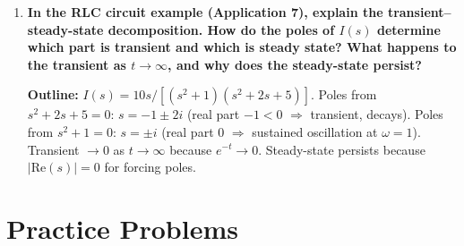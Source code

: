 \documentclass[12pt,a4paper]{article}
\begin{document}
\begin{enumerate}
\textbf{Outline:} $(s+0)X + 2Y = 1$; $-2X + sY = 0$.
Determinant: $s^2+4$.
$X = s/(s^2+4) \to \cos(2t)$.
$Y = 2/(s^2+4) \to \sin(2t)$.
The system represents circular motion.

\item \textbf{In the RLC circuit example (Application 7), explain the transient--steady-state
decomposition. How do the poles of $I(s)$ determine which part is transient and which
is steady state? What happens to the transient as $t\to\infty$, and why does the
steady-state persist?}

\textbf{Outline:} $I(s) = 10s/[(s^2+1)(s^2+2s+5)]$.
Poles from $s^2+2s+5=0$: $s=-1\pm 2i$ (real part $-1<0$ $\Rightarrow$ transient, decays).
Poles from $s^2+1=0$: $s=\pm i$ (real part $0$ $\Rightarrow$ sustained oscillation at $\omega=1$).
Transient $\to 0$ as $t\to\infty$ because $e^{-t}\to 0$.
Steady-state persists because $|\text{Re}(s)|=0$ for forcing poles.

\end{enumerate}

\section{Practice Problems}
\end{document}
